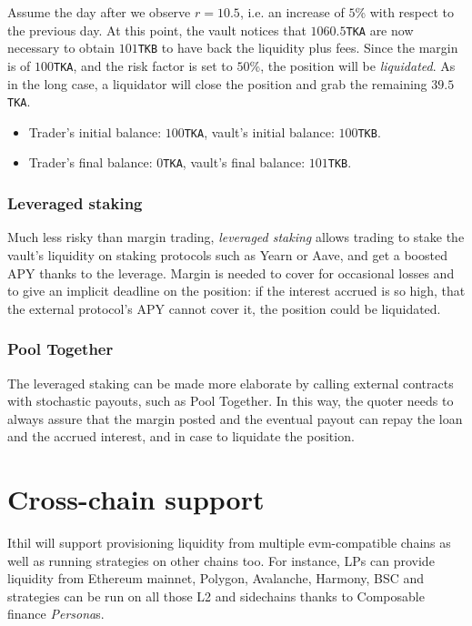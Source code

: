 \documentclass[a4paper,10 pt]{article}
\theoremstyle{definition}
\begin{document}
Assume the day after we observe $r = 10.5$, i.e. an increase of $5$\% with respect to the previous day.  At this point, the vault notices that $1060.5$\verb|TKA| are now necessary to obtain $101$\verb|TKB| to have back the liquidity plus fees. Since the margin is of $100$\verb|TKA|, and the risk factor is set to $50$\%, the position will be \emph{liquidated}. As in the long case, a liquidator will close the position and grab the remaining $39.5$\verb|TKA|.
\begin{itemize}
    \item Trader's initial balance: $100$\verb|TKA|, vault's initial balance: $100$\verb|TKB|.
    \item Trader's final balance: $0$\verb|TKA|, vault's final balance: $101$\verb|TKB|.
\end{itemize}

\subsubsection{Leveraged staking}

Much less risky than margin trading, {\it leveraged staking} allows trading to stake the vault's liquidity on staking protocols such as Yearn or Aave, and get a boosted APY thanks to the leverage. Margin is needed to cover for occasional losses and to give an implicit deadline on the position: if the interest accrued is so high, that the external protocol's APY cannot cover it, the position could be liquidated.

\subsubsection{Pool Together}

The leveraged staking can be made more elaborate by calling external contracts with stochastic payouts, such as Pool Together. In this way, the quoter needs to always assure that the margin posted and the eventual payout can repay the loan and the accrued interest, and in case to liquidate the position.

\section{Cross-chain support}
Ithil will support provisioning liquidity from multiple evm-compatible chains as well as running strategies on other chains too.
For instance, LPs can provide liquidity from Ethereum mainnet, Polygon, Avalanche, Harmony, BSC and strategies can be run on all those L2 and sidechains thanks to Composable finance \textit{Persona}s.
\end{document}
